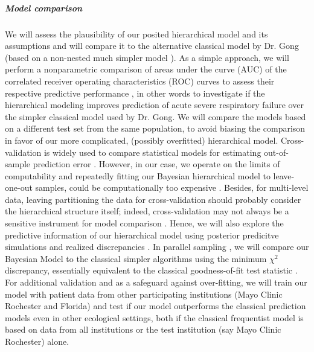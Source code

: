 \documentclass[11pt,notitlepage]{article}
\begin{document}
\subparagraph*{Model comparison}
We will assess the plausibility of our posited hierarchical model and its assumptions \cite{Gelman_predictive_2000,GelmanMengStern1996} and will compare it to the alternative classical model by Dr. Gong (based on a non-nested much simpler model \cite{Herridge_12594312}). As a simple approach, we will perform a nonparametric comparison of areas under the curve (AUC) of the correlated receiver operating characteristics (ROC) curves \cite{DeLong_3203132} to assess their respective predictive performance \cite{Newcombe_22890972,Wu_20473190}, in other words to investigate if the hierarchical modeling improves prediction of acute severe respiratory failure over the simpler classical model used by Dr. Gong. We will compare the models based on a different test set from the same population, to avoid biasing the comparison in favor of our more complicated, (possibly overfitted) hierarchical model. Cross-validation is widely used to compare statistical models for estimating out-of-sample prediction error \cite{Vehtari_12396570}. However, in our case, we operate on the limits of computability and repeatedly fitting our Bayesian hierarchical model to leave-one-out samples, could be computationally too expensive \cite{Gelman_Aki_2014predictive}. Besides, for multi-level data, leaving partitioning the data for cross-validation should probably consider the hierarchical structure itself; indeed, cross-validation may not always be a sensitive instrument for model comparison \cite{wang_predictive_2014}. Hence, we will also explore the predictive information of our hierarchical model using posterior predicitve simulations and realized discrepancies \cite{Gelman_Aki_2014predictive,Gelman_predictive_2000,GelmanMengStern1996}. In parallel sampling \cite{Congdon_modelcomparison_2005}, we will compare our Bayesian Model to the classical simpler algorithms using the minimum $\chi^{2}$ discrepancy, essentially equivalent to the classical
goodness-of-fit test statistic \cite{GelmanMengStern1996}. For additional validation and as a safeguard against over-fitting, we will train our model with patient data from other participating institutions (Mayo Clinic Rochester and Florida) and test if our model outperforms the classical prediction models even in other ecological settings, both if the classical frequentist model is based on data from all institutions or the test institution (say Mayo Clinic Rochester) alone. 
\end{document}
